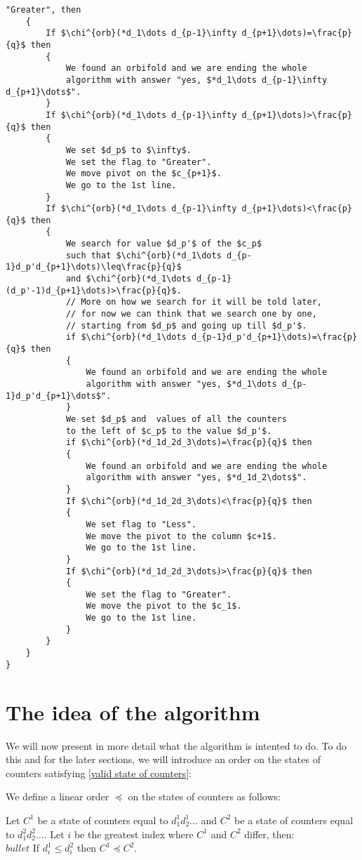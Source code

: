 \begin{lstlisting}[firstnumber=1,consecutivenumbers=true]
    "Greater", then
    {
        If $\chi^{orb}(*d_1\dots d_{p-1}\infty d_{p+1}\dots)=\frac{p}{q}$ then
        {
            We found an orbifold and we are ending the whole
            algorithm with answer "yes, $*d_1\dots d_{p-1}\infty d_{p+1}\dots$".
        } 
        If $\chi^{orb}(*d_1\dots d_{p-1}\infty d_{p+1}\dots)>\frac{p}{q}$ then
        {
            We set $d_p$ to $\infty$.
            We set the flag to "Greater".
            We move pivot on the $c_{p+1}$.
            We go to the 1st line.
        }  
        If $\chi^{orb}(*d_1\dots d_{p-1}\infty d_{p+1}\dots)<\frac{p}{q}$ then
        {
            We search for value $d_p'$ of the $c_p$ 
            such that $\chi^{orb}(*d_1\dots d_{p-1}d_p'd_{p+1}\dots)\leq\frac{p}{q}$ 
            and $\chi^{orb}(*d_1\dots d_{p-1}(d_p'-1)d_{p+1}\dots)>\frac{p}{q}$.
            // More on how we search for it will be told later, 
            // for now we can think that we search one by one,
            // starting from $d_p$ and going up till $d_p'$.
            if $\chi^{orb}(*d_1\dots d_{p-1}d_p'd_{p+1}\dots)=\frac{p}{q}$ then 
            {
                We found an orbifold and we are ending the whole
                algorithm with answer "yes, $*d_1\dots d_{p-1}d_p'd_{p+1}\dots$".
            }
            We set $d_p$ and  values of all the counters 
            to the left of $c_p$ to the value $d_p'$.
            if $\chi^{orb}(*d_1d_2d_3\dots)=\frac{p}{q}$ then 
            {
                We found an orbifold and we are ending the whole
                algorithm with answer "yes, $*d_1d_2\dots$".
            }
            If $\chi^{orb}(*d_1d_2d_3\dots)<\frac{p}{q}$ then 
            {
                We set flag to "Less".
                We move the pivot to the column $c+1$.
                We go to the 1st line.
            }
            If $\chi^{orb}(*d_1d_2d_3\dots)>\frac{p}{q}$ then 
            {
                We set the flag to "Greater".
                We move the pivot to the $c_1$.
                We go to the 1st line.
            }
        }  
    }
}
\end{lstlisting}
\section{The idea of the algorithm}
We will now present in more detail what the algorithm is intented to do. 
To do this and for the later sections, we will introduce an order on the states 
of counters satisfying \ref{valid state of counters}: 
\begin{definition}
We define a linear order $\preceq$ on the states of counters as follows:

Let $C^1$ be a state of counters equal to $d_1^1d_2^1\dots$ and $C^2$ be a state of counters 
equal to $d_1^2d_2^2\dots$. Let $i$ be the greatest index where $C^1$ and $C^2$ differ, then:\\
$bullet$ If $d_i^1 \leq d_i^2$ then $C^1 \preceq C^2$. 
\end{definition}

